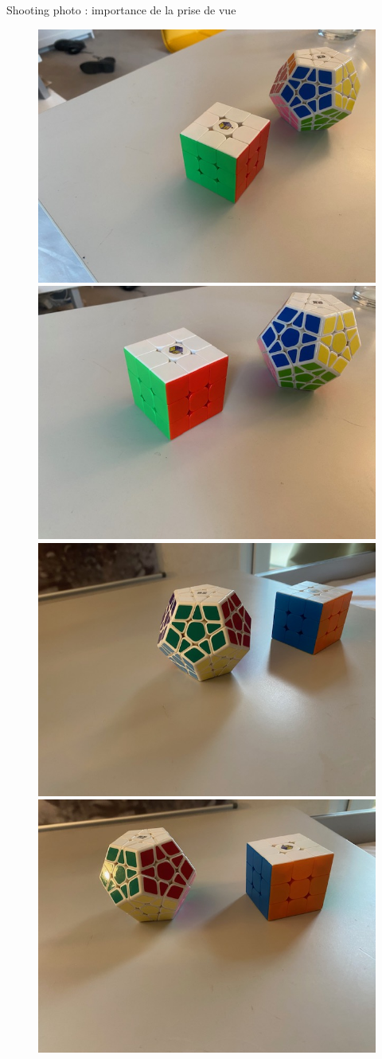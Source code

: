 \begin{frame}{Shooting photo : importance de la prise de vue}
  \centering
  \begin{minipage}{0.48\linewidth}
    \centering
    \begin{figure}
      \centering
      \includegraphics[width=0.48\linewidth]{capture/dodec0.jpg}%
      \includegraphics[width=0.48\linewidth]{capture/dodec1.jpg} \\
      \includegraphics[width=0.48\linewidth]{capture/dodec2.jpg}%
      \includegraphics[width=0.48\linewidth]{capture/dodec3.jpg}

\end{figure}
\end{minipage}
\end{frame}
